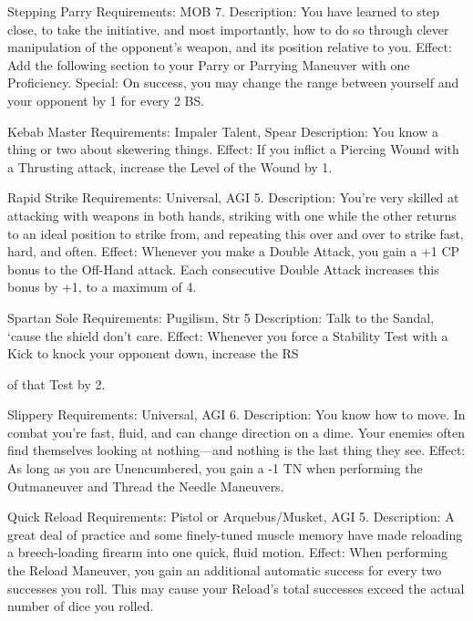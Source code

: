 \documentclass[oneside,11pt,english]{book}
\begin{document}
 

Stepping Parry 
Requirements: MOB 7. 
Description: You have learned to step close, to take the initiative, and most importantly, how to do so 
through clever manipulation of the opponent’s weapon, and its position relative to you. 
Effect: Add the following section to your Parry or Parrying Maneuver with one Proficiency. Special: On 
success, you may change the range between yourself and your opponent by 1 for every 2 BS. 

 

Kebab Master 
Requirements: Impaler Talent, Spear 
Description: You know a thing or two about skewering things. 
Effect: If you inflict a Piercing Wound with a Thrusting attack, increase the Level of the Wound by 1. 

 

Rapid Strike 
Requirements: Universal, AGI 5. 
Description: You're very skilled at attacking with weapons in both hands, striking with one while the 
other returns to an ideal position to strike from, and repeating this over and over to strike fast, hard, and 
often. 
Effect: Whenever you make a Double Attack, you gain a +1 CP bonus to the Off-Hand attack. Each 
consecutive Double Attack increases this bonus by +1, to a maximum of 4. 

 

Spartan Sole 
Requirements: Pugilism, Str 5 
Description: Talk to the Sandal, ‘cause the shield don’t care. 
Effect: Whenever you force a Stability Test with a Kick to knock your opponent down, increase the RS 


of that Test by 2. 

 

Slippery 
Requirements: Universal, AGI 6. 
Description: You know how to move. In combat you're fast, fluid, and can change direction on a dime. 
Your enemies often find themselves looking at nothing—and nothing is the last thing they see. 
Effect: As long as you are Unencumbered, you gain a -1 TN when performing the Outmaneuver and 
Thread the Needle Maneuvers. 

 

 

Quick Reload 
Requirements: Pistol or Arquebus/Musket, AGI 5. 
Description: A great deal of practice and some finely-tuned muscle memory have made reloading a 
breech-loading firearm into one quick, fluid motion. 
Effect: When performing the Reload Maneuver, you gain an additional automatic success for every two 
successes you roll. This may cause your Reload’s total successes exceed the actual number of dice you 
rolled. 
\end{document}
